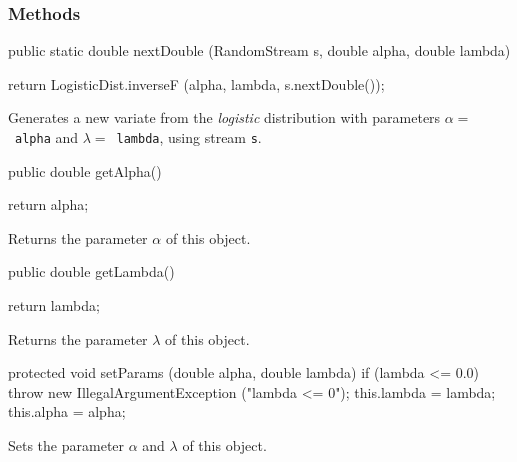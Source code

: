 \subsubsection* {Methods}
\begin{code}

   public static double nextDouble (RandomStream s,
                                    double alpha, double lambda)\begin{hide} {
      return  LogisticDist.inverseF (alpha, lambda, s.nextDouble());
   }
\end{hide}
\end{code}
\begin{tabb}  Generates a new variate from the {\em logistic\/} distribution
   with parameters $\alpha = $~\texttt{alpha} and $\lambda = $~\texttt{lambda},
   using stream \texttt{s}.
\end{tabb}
\begin{code}

   public double getAlpha()\begin{hide} {
      return alpha;
   }\end{hide}
\end{code}
\begin{tabb} Returns the parameter $\alpha$ of this object.
\end{tabb}
\begin{code}

   public double getLambda()\begin{hide} {
      return lambda;
   }\end{hide}
\end{code}
\begin{tabb} Returns the parameter $\lambda$ of this object.
\end{tabb}
\begin{hide}\begin{code}

   protected void setParams (double alpha, double lambda) {
      if (lambda <= 0.0)
         throw new IllegalArgumentException ("lambda <= 0");
      this.lambda = lambda;
      this.alpha = alpha;
   }
\end{code}
\begin{tabb} Sets the parameter $\alpha$ and $\lambda$ of this object.
\end{tabb}
\begin{code}
}
\end{code}
\end{hide}
